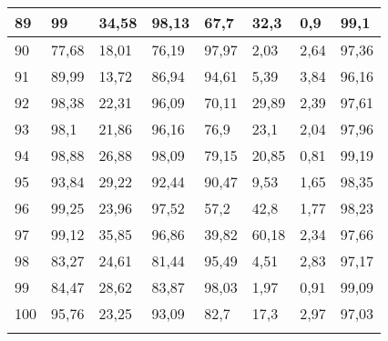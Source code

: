 \begin{longtable}[c]{|l|l|l|l|l|l|l|l|}
89              & 99           & 34,58        & 98,13       & 67,7          & 32,3          & 0,9           & 99,1          \\ \hline
90              & 77,68        & 18,01        & 76,19       & 97,97         & 2,03          & 2,64          & 97,36         \\ \hline
91              & 89,99        & 13,72        & 86,94       & 94,61         & 5,39          & 3,84          & 96,16         \\ \hline
92              & 98,38        & 22,31        & 96,09       & 70,11         & 29,89         & 2,39          & 97,61         \\ \hline
93              & 98,1         & 21,86        & 96,16       & 76,9          & 23,1          & 2,04          & 97,96         \\ \hline
94              & 98,88        & 26,88        & 98,09       & 79,15         & 20,85         & 0,81          & 99,19         \\ \hline
95              & 93,84        & 29,22        & 92,44       & 90,47         & 9,53          & 1,65          & 98,35         \\ \hline
96              & 99,25        & 23,96        & 97,52       & 57,2          & 42,8          & 1,77          & 98,23         \\ \hline
97              & 99,12        & 35,85        & 96,86       & 39,82         & 60,18         & 2,34          & 97,66         \\ \hline
98              & 83,27        & 24,61        & 81,44       & 95,49         & 4,51          & 2,83          & 97,17         \\ \hline
99              & 84,47        & 28,62        & 83,87       & 98,03         & 1,97          & 0,91          & 99,09         \\ \hline
100             & 95,76        & 23,25        & 93,09       & 82,7          & 17,3          & 2,97          & 97,03         \\ \hline
\label{anx:alpha}
\end{longtable}
